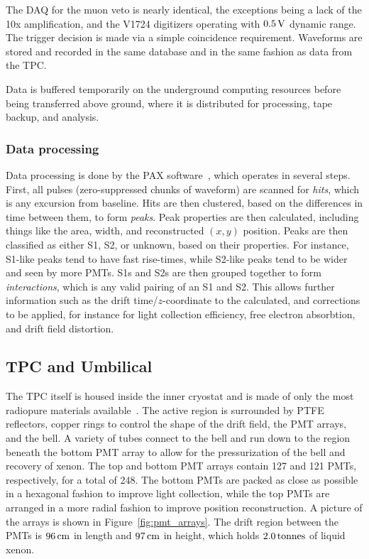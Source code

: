 The DAQ for the muon veto is nearly identical, the exceptions being a lack of the 10x amplification, and the V1724 digitizers operating with $0.5\, \mathrm{V}$ dynamic range. The trigger decision is made via a simple coincidence requirement. Waveforms are stored and recorded in the same database and in the same fashion as data from the TPC.

Data is buffered temporarily on the underground computing resources before being transferred above ground, where it is distributed for processing, tape backup, and analysis.

\subsubsection{Data processing}

Data processing is done by the PAX software~\cite{pax}, which operates in several steps. First, all pulses (zero-suppressed chunks of waveform) are scanned for \textit{hits}, which is any excursion from baseline. Hits are then clustered, based on the differences in time between them, to form \textit{peaks}. Peak properties are then calculated, including things like the area, width, and reconstructed $(x,y)$ position. Peaks are then classified as either S1, S2, or unknown, based on their properties. For instance, S1-like peaks tend to have fast rise-times, while S2-like peaks tend to be wider and seen by more PMTs. S1s and S2s are then grouped together to form \textit{interactions}, which is any valid pairing of an S1 and S2. This allows further information such as the drift time/$z$-coordinate to the calculated, and corrections to be applied, for instance for light collection efficiency, free electron absorbtion, and drift field distortion.

\subsection{TPC and Umbilical}

The TPC itself is housed inside the inner cryostat and is made of only the most radiopure materials available~\cite{Aprile:2017ilq}. The active region is surrounded by PTFE reflectors, copper rings to control the shape of the drift field, the PMT arrays, and the bell. A variety of tubes connect to the bell and run down to the region beneath the bottom PMT array to allow for the pressurization of the bell and recovery of xenon. The top and bottom PMT arrays contain 127 and 121 PMTs, respectively, for a total of 248. The bottom PMTs are packed as close as possible in a hexagonal fashion to improve light collection, while the top PMTs are arranged in a more radial fashion to improve position reconstruction. A picture of the arrays is shown in Figure~\ref{fig:pmt_arrays}. The drift region between the PMTs is $96\, \mathrm{cm}$ in length and $97\, \mathrm{cm}$ in height, which holds $2.0\, \mathrm{tonnes}$ of liquid xenon.

